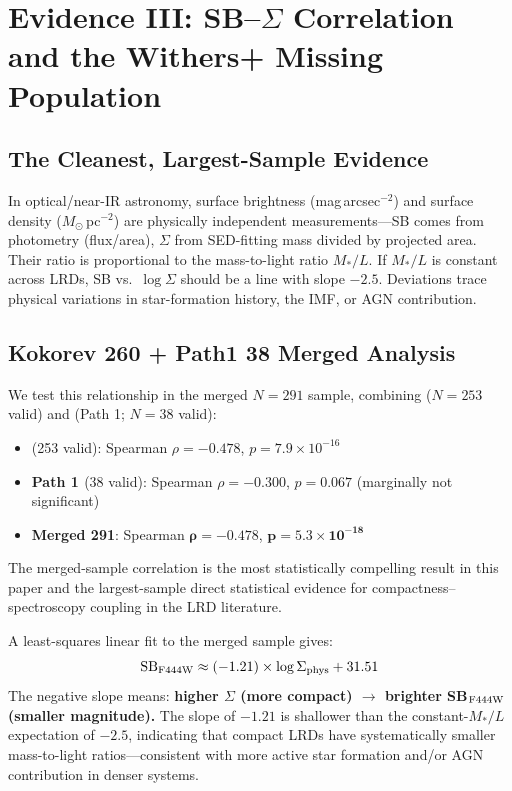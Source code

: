 \documentclass[twocolumn,linenumbers]{aastex631}
\begin{document}
\section{Evidence III: SB--$\Sigma$ Correlation and the Withers+ Missing Population} \label{sec:ev3}

\subsection{The Cleanest, Largest-Sample Evidence}

In optical/near-IR astronomy, surface brightness (mag\,arcsec$^{-2}$) and surface density ($M_\odot$\,pc$^{-2}$) are physically independent measurements---SB comes from photometry (flux/area), $\Sigma$ from SED-fitting mass divided by projected area. Their ratio is proportional to the mass-to-light ratio $M_*/L$. If $M_*/L$ is constant across LRDs, SB vs.\ $\log\Sigma$ should be a line with slope $-2.5$. Deviations trace physical variations in star-formation history, the IMF, or AGN contribution.

\subsection{Kokorev 260 + Path1 38 Merged Analysis}

We test this relationship in the merged $N=291$ sample, combining \citet{Kokorev2024} ($N=253$ valid) and \citet{deGraaff2025} (Path 1; $N=38$ valid):

\begin{itemize}
\item \textbf{\citet{Kokorev2024}} (253 valid): Spearman $\rho = -0.478$, $p = 7.9 \times 10^{-16}$
\item \textbf{Path 1 \citep{deGraaff2025}} (38 valid): Spearman $\rho = -0.300$, $p = 0.067$ (marginally not significant)
\item \textbf{Merged 291}: Spearman $\boldsymbol{\rho = -0.478}$, $\boldsymbol{p = 5.3 \times 10^{-18}}$
\end{itemize}

The merged-sample correlation is the most statistically compelling result in this paper and the largest-sample direct statistical evidence for compactness--spectroscopy coupling in the LRD literature.

A least-squares linear fit to the merged sample gives:
\begin{equation}
{\rm SB}_{\rm F444W} \approx (-1.21) \times \log\Sigma_{\rm phys} + 31.51
\end{equation}
The negative slope means: \textbf{higher $\Sigma$ (more compact) $\rightarrow$ brighter SB$_{\rm F444W}$ (smaller magnitude).} The slope of $-1.21$ is shallower than the constant-$M_*/L$ expectation of $-2.5$, indicating that compact LRDs have systematically smaller mass-to-light ratios---consistent with more active star formation and/or AGN contribution in denser systems.
\end{document}
